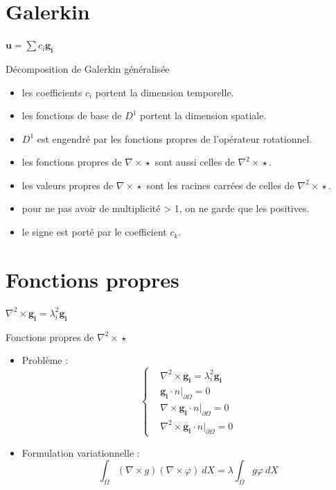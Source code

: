 \documentclass{beamer}
\newcommand{\rot}{{\nabla\times}}
\newcommand{\rott}{{\nabla^2\times}}
\newcommand{\restr}{{\big\rvert_{\partial\Omega}}}
\begin{document}
\section{Galerkin}
\begin{frame}{$\mathbf{u}=\sum c_i\mathbf{g_i}$}
\begin{block}{Décomposition de Galerkin généralisée}
\begin{itemize}
\item les coefficients $c_i$ portent la dimension temporelle.
\item les fonctions de base de $D^1$ portent la dimension spatiale.
\item $D^1$ est engendré par les fonctions propres de l'opérateur rotationnel.
\item les fonctions propres de $\rot\star$ sont aussi celles de $\rott\star$.
\item les valeurs propres de $\rot\star$ sont les racines carrées de celles de $\rott\star$.
\item pour ne pas avoir de multiplicité > 1, on ne garde que les positives.
\item le signe est porté par le coefficient $c_k$.
\end{itemize}
\end{block}
\end{frame}

\section{Fonctions propres}
\begin{frame}{$\rott  \mathbf{g_i} = \lambda_i^2 \mathbf{g_i}$}
\begin{block}{Fonctions propres de $\rott\star$}
\begin{itemize}
\item Problème :
\[
\left\{
\begin{aligned}
&\rott  \mathbf{g_i} = \lambda_i^2 \mathbf{g_i}\\
&\mathbf{g_i}\cdot n\restr = 0\\
&\rot \mathbf{g_i}\cdot n\restr = 0\\
&\rott  \mathbf{g_i}\cdot n\restr = 0
\end{aligned}
\right.
\]
\item Formulation variationnelle :
\[
\int_\Omega (\rot g)(\rot\varphi)\ dX = \lambda\int_\Omega g\varphi\ dX
\]
\end{itemize}
\end{block}
\end{frame}
\end{document}
